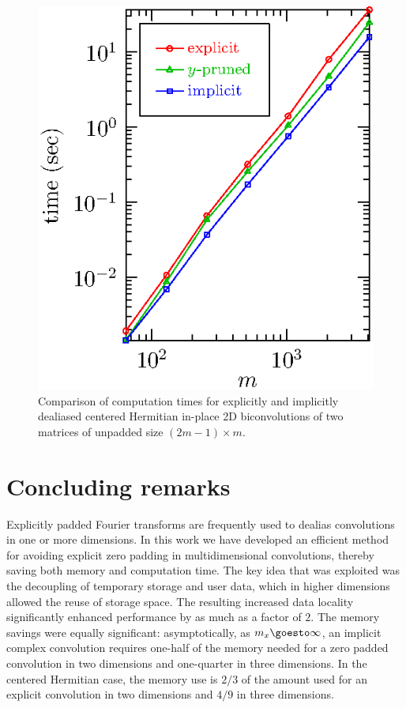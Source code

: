 \documentclass[final]{siamltex}
\begin{document}
\begin{figure}[htbp]
\begin{center}
\begin{minipage}{0.49\linewidth}
\begin{center}
\includegraphics{timing2b}
\caption{Comparison of computation times for explicitly and implicitly
dealiased centered Hermitian in-place 2D biconvolutions of two matrices of
unpadded size $(2m-1)\times m$.}
\label{timing2b}
\end{center}
\end{minipage}
\end{center}
\end{figure}

\section{Concluding remarks}
Explicitly padded Fourier transforms are frequently used to dealias
convolutions in one or more dimensions.
In this work we have developed an efficient method for avoiding explicit zero
padding in multidimensional convolutions, thereby saving both memory and
computation time. The key idea that was exploited was the decoupling
of temporary storage and user data, which in higher dimensions allowed
the reuse of storage space. The resulting increased data locality
significantly enhanced performance by as much as a factor of $2$.
The memory savings were equally significant: asymptotically, as
$m_x\goesto\infty$, an implicit complex convolution requires one-half of
the memory needed for a zero padded convolution in two dimensions and
one-quarter in three dimensions. In the centered Hermitian case, the memory
use is $2/3$ of the amount used for an explicit convolution in two
dimensions and $4/9$ in three dimensions. 
\end{document}
